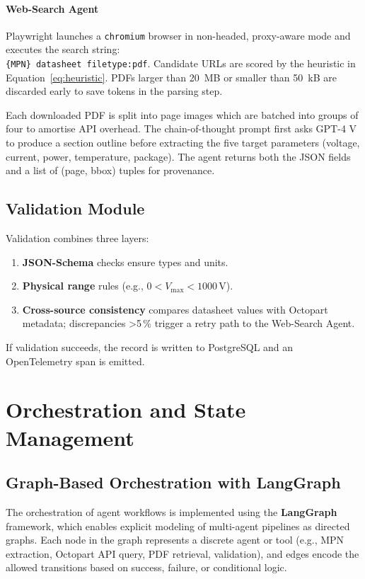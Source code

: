 \paragraph{Web-Search Agent}  Playwright launches a \texttt{chromium} browser in non-headed, proxy-aware mode and executes the search string:\\
\texttt{\{MPN\} datasheet filetype:pdf}.  Candidate URLs are scored by the heuristic in Equation~\ref{eq:heuristic}.  PDFs larger than 20~MB or smaller than 50~kB are discarded early to save tokens in the parsing step.

Each downloaded PDF is split into page images which are batched into groups of four to amortise API overhead.  The chain-of-thought prompt first asks GPT-4 V to produce a section outline before extracting the five target parameters (voltage, current, power, temperature, package).  The agent returns both the JSON fields and a list of (page, bbox) tuples for provenance.

\subsection{Validation Module}
Validation combines three layers:
\begin{enumerate}
  \item \textbf{JSON-Schema} checks ensure types and units.
  \item \textbf{Physical range} rules (e.g., $0< V_{\max}<1000\,\mathrm{V}$).
  \item \textbf{Cross-source consistency} compares datasheet values with Octopart metadata; discrepancies >5\,\% trigger a retry path to the Web-Search Agent.
\end{enumerate}
If validation succeeds, the record is written to PostgreSQL and an OpenTelemetry span is emitted.

\section{Orchestration and State Management}
\subsection{Graph-Based Orchestration with LangGraph}

The orchestration of agent workflows is implemented using the \textbf{LangGraph} framework, which enables explicit modeling of multi-agent pipelines as directed graphs. Each node in the graph represents a discrete agent or tool (e.g., MPN extraction, Octopart API query, PDF retrieval, validation), and edges encode the allowed transitions based on success, failure, or conditional logic.

